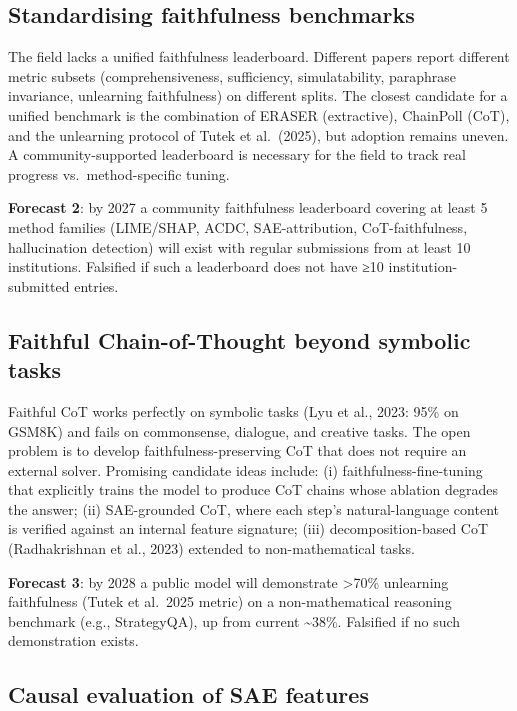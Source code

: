 \subsection{Standardising faithfulness benchmarks}\label{standardising-faithfulness-benchmarks}

The field lacks a unified faithfulness leaderboard. Different papers report different metric subsets (comprehensiveness, sufficiency, simulatability, paraphrase invariance, unlearning faithfulness) on different splits. The closest candidate for a unified benchmark is the combination of ERASER (extractive), ChainPoll (CoT), and the unlearning protocol of Tutek et al.~(2025), but adoption remains uneven. A community-supported leaderboard is necessary for the field to track real progress vs.~method-specific tuning.

\textbf{Forecast 2}: by 2027 a community faithfulness leaderboard covering at least 5 method families (LIME/SHAP, ACDC, SAE-attribution, CoT-faithfulness, hallucination detection) will exist with regular submissions from at least 10 institutions. Falsified if such a leaderboard does not have ≥10 institution-submitted entries.

\subsection{Faithful Chain-of-Thought beyond symbolic tasks}\label{faithful-chain-of-thought-beyond-symbolic-tasks}

Faithful CoT works perfectly on symbolic tasks (Lyu et al., 2023: 95\% on GSM8K) and fails on commonsense, dialogue, and creative tasks. The open problem is to develop faithfulness-preserving CoT that does not require an external solver. Promising candidate ideas include: (i) faithfulness-fine-tuning that explicitly trains the model to produce CoT chains whose ablation degrades the answer; (ii) SAE-grounded CoT, where each step's natural-language content is verified against an internal feature signature; (iii) decomposition-based CoT (Radhakrishnan et al., 2023) extended to non-mathematical tasks.

\textbf{Forecast 3}: by 2028 a public model will demonstrate \textgreater70\% unlearning faithfulness (Tutek et al.~2025 metric) on a non-mathematical reasoning benchmark (e.g., StrategyQA), up from current \textasciitilde38\%. Falsified if no such demonstration exists.

\subsection{Causal evaluation of SAE features}\label{causal-evaluation-of-sae-features}

